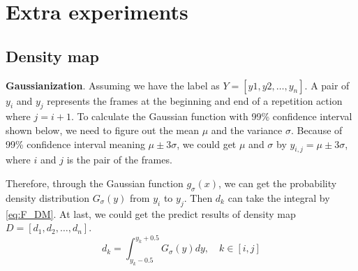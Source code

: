 \documentclass[10pt,twocolumn,letterpaper]{article}
\begin{document}
 \appendix

\section{Extra experiments}



\subsection{Density map}

\textbf{Gaussianization}.
Assuming we have the label as $Y=[y1,y2,\dots,y_n]$. A pair of $y_i$ and $y_j$ represents the frames at the beginning and end of a repetition action where $j = i+1$. To calculate the Gaussian function \cite{guo2011simple} with 99\% confidence interval shown below, we need to figure out the mean $\mu$ and the variance $\sigma$. Because of 99\% confidence interval meaning $\mu \pm 3\sigma$, we could get $\mu$ and $\sigma$ by $y_{i,j} = \mu \pm 3\sigma$, where $i$ and $j$ is the pair of the frames. 

 Therefore, through the Gaussian function $g_\sigma(x)$, we can get the probability density distribution $G_\sigma(y)$ from $y_i$ to $y_j$. Then $d_k$ can take the integral by \cref{eq:F_DM}. At last, we could get the predict results of density map $D = [d_1,d_2,\dots,d_n]$.  
 \begin{equation}
     d_k = \int_{y_k - 0.5}^{y_k + 0.5} G_\sigma(y)dy,\quad k\in[i,j]
     \label{eq:F_DM}
\end{equation}
\end{document}
